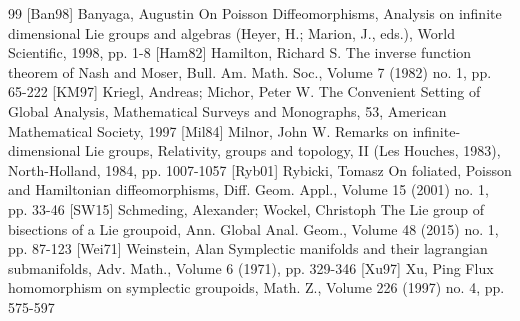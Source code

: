 \begin{thebibliography}{99}
 [Ban98] Banyaga, Augustin On Poisson Diffeomorphisms, Analysis on infinite dimensional Lie groups and algebras (Heyer, H.; Marion, J., eds.), World Scientific, 1998, pp. 1-8
 [Ham82] Hamilton, Richard S. The inverse function theorem of Nash and Moser, Bull. Am. Math. Soc., Volume 7 (1982) no. 1, pp. 65-222
 [KM97] Kriegl, Andreas; Michor, Peter W. The Convenient Setting of Global Analysis, Mathematical Surveys and Monographs, 53, American Mathematical Society, 1997
 [Mil84] Milnor, John W. Remarks on infinite-dimensional Lie groups, Relativity, groups and topology, II (Les Houches, 1983), North-Holland, 1984, pp. 1007-1057
 [Ryb01] Rybicki, Tomasz On foliated, Poisson and Hamiltonian diffeomorphisms, Diff. Geom. Appl., Volume 15 (2001) no. 1, pp. 33-46
 [SW15] Schmeding, Alexander; Wockel, Christoph The Lie group of bisections of a Lie groupoid, Ann. Global Anal. Geom., Volume 48 (2015) no. 1, pp. 87-123
 [Wei71] Weinstein, Alan Symplectic manifolds and their lagrangian submanifolds, Adv. Math., Volume 6 (1971), pp. 329-346
 [Xu97] Xu, Ping Flux homomorphism on symplectic groupoids, Math. Z., Volume 226 (1997) no. 4, pp. 575-597
\end{thebibliography}
